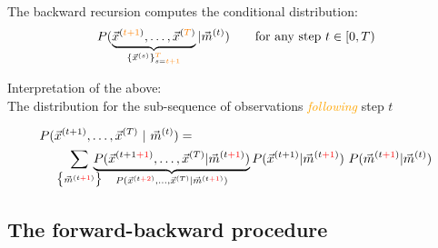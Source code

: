\begin{frame}{\subsecname}

The backward recursion computes the conditional distribution:
\begin{equation}
P(
\underbrace{
	\vec x^{({\color{orange}t+1})}, \ldots, \vec x^{({\color{orange}T})}
}_{
	\{\vec x^{(s)}\}_{s={\color{orange}t+1}}^{{\color{orange}T}}
}
| \vec m^{(t)})
\qquad 
\text{for any step }t \in \lbrack0, T)
\end{equation}

Interpretation of the above:\\

The distribution for the sub-sequence of observations \emph{\textcolor{orange}{following}} step $t$


\pause


\pause

\svspace{-5mm}

\begin{align}
P(&\vec{x}^{(t+1)}, \ldots, \vec{x}^{(T)} ~|~ \vec{m}^{(t)}) =\\
				&\sum_{\big\{\vec{m}^{(t{\color{red}+1})}\big\}} \kern-2ex
				\underbrace{
				P(\vec{x}^{(t+1{\color{red}+1})}, \ldots, \vec{x}^{(T)} | \vec{m}^{(t{\color{red}+1})})
				}_{
				P(\vec{x}^{(t{\color{red}+2})}, \ldots, \vec{x}^{(T)} | \vec{m}^{(t{\color{red}+1})})
				}
				P(\vec{x}^{(t{+1})} | \vec{m}^{(t{\color{red}+1})}) ~
				P(\vec{m}^{(t{\color{red}+1})} | \vec{m}^{(t)})
\end{align}


\end{frame}

\subsection{The forward-backward procedure}

